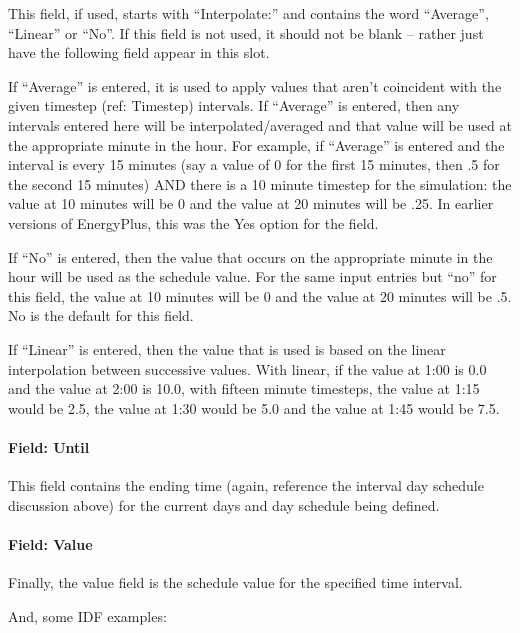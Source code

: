This field, if used, starts with ``Interpolate:'' and contains the word ``Average'', ``Linear'' or ``No''. If this field is not used, it should not be blank -- rather just have the following field appear in this slot.

If ``Average'' is entered, it is used to apply values that aren't coincident with the given timestep (ref: Timestep) intervals. If ``Average'' is entered, then any intervals entered here will be interpolated/averaged and that value will be used at the appropriate minute in the hour. For example, if ``Average'' is entered and the interval is every 15 minutes (say a value of 0 for the first 15 minutes, then .5 for the second 15 minutes) AND there is a 10 minute timestep for the simulation: the value at 10 minutes will be 0 and the value at 20 minutes will be .25. In earlier versions of EnergyPlus, this was the Yes option for the field.

If ``No'' is entered, then the value that occurs on the appropriate minute in the hour will be used as the schedule value. For the same input entries but ``no'' for this field, the value at 10 minutes will be 0 and the value at 20 minutes will be .5. No is the default for this field.

If ``Linear'' is entered, then the value that is used is based on the linear interpolation between successive values. With linear, if the value at 1:00 is 0.0 and the value at 2:00 is 10.0, with fifteen minute timesteps, the value at 1:15 would be 2.5, the value at 1:30 would be 5.0 and the value at 1:45 would be 7.5.

\paragraph{Field: Until}\label{field-until}

This field contains the ending time (again, reference the interval day schedule discussion above) for the current days and day schedule being defined.

\paragraph{Field: Value}\label{field-value-1}

Finally, the value field is the schedule value for the specified time interval.

And, some IDF examples:

